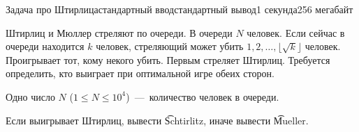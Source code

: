 \begin{problem}{Задача про Штирлица}{стандартный ввод}{стандартный вывод}{1 секунда}{256 мегабайт}

Штирлиц и Мюллер стреляют по очереди. В очереди $N$ человек. Если сейчас в очереди находится $k$ человек, стреляющий может убить $1, 2, \ldots, \lfloor \sqrt{k} \rfloor$ человек. Проигрывает тот, кому некого убить. Первым стреляет Штирлиц. Требуется определить, кто выиграет при оптимальной игре обеих сторон.

\InputFile
Одно число $N$ ($1 \le N \le 10^4$)~---~количество человек в очереди. 

\OutputFile
Если выигрывает Штирлиц, вывести \t{Schtirlitz}, иначе вывести \t{Mueller}.

\Examples

\begin{example}
%
%
\end{example}

\end{problem}

